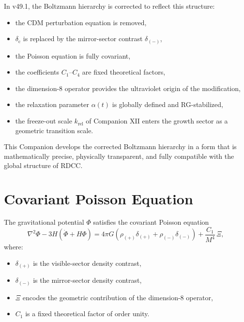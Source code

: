 \documentclass[11pt,a4paper]{article}
\begin{document}
In v49.1, the Boltzmann hierarchy is corrected to reflect this structure:
\begin{itemize}[leftmargin=0.8cm]
  \item the CDM perturbation equation is removed,
  \item \(\delta_{\mathrm{c}}\) is replaced by the mirror-sector contrast \(\delta_{(-)}\),
  \item the Poisson equation is fully covariant,
  \item the coefficients \(C_1\)--\(C_4\) are fixed theoretical factors,
  \item the dimension-8 operator provides the ultraviolet origin of the
        modification,
  \item the relaxation parameter \(\alpha(t)\) is globally defined and
        RG-stabilized,
  \item the freeze-out scale \(k_{\mathrm{rel}}\) of Companion XII enters the
        growth sector as a geometric transition scale.
\end{itemize}

This Companion develops the corrected Boltzmann hierarchy in a form that is
mathematically precise, physically transparent, and fully compatible with the
global structure of RDCC.


\section[Covariant Poisson Equation]{Covariant Poisson Equation}

The gravitational potential \(\Phi\) satisfies the covariant Poisson equation
\begin{equation}
\nabla^2 \Phi - 3H(\dot{\Phi} + H\Phi)
=
4\pi G
\left(
\rho_{(+)} \delta_{(+)}
+
\rho_{(-)} \delta_{(-)}
\right)
+
\frac{C_1}{M^4} \, \Xi,
\end{equation}
where:
\begin{itemize}[leftmargin=0.8cm]
  \item \(\delta_{(+)}\) is the visible-sector density contrast,
  \item \(\delta_{(-)}\) is the mirror-sector density contrast,
  \item \(\Xi\) encodes the geometric contribution of the dimension-8 operator,
  \item \(C_1\) is a fixed theoretical factor of order unity.
\end{itemize}
\end{document}
